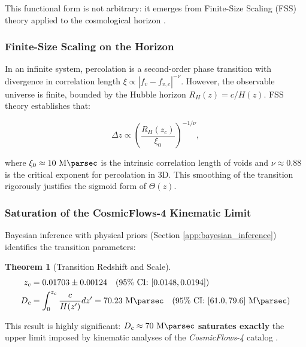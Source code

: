 \documentclass[11pt, a4paper]{article}
\theoremstyle{plain}
\newtheorem{theorem}{Theorem}[section]
\theoremstyle{definition}
\begin{document}
This functional form is not arbitrary: it emerges from Finite-Size Scaling (FSS) theory applied to the cosmological horizon \cite{Cardy1996}.

\subsubsection{Finite-Size Scaling on the Horizon}

In an infinite system, percolation is a second-order phase transition with divergence in correlation length $\xi \propto |f_v - f_{v,c}|^{-\nu}$. However, the observable universe is finite, bounded by the Hubble horizon $R_H(z) = c/H(z)$. FSS theory establishes that:

\begin{equation}
\Delta z \propto \left(\frac{R_H(z_c)}{\xi_0}\right)^{-1/\nu},
\label{eq:fss_scaling}
\end{equation}

where $\xi_0 \approx 10\ \si{\mega\parsec}$ is the intrinsic correlation length of voids and $\nu \approx 0.88$ is the critical exponent for percolation in 3D. This smoothing of the transition rigorously justifies the sigmoid form of $\Theta(z)$.

\subsubsection{Saturation of the CosmicFlows-4 Kinematic Limit}

Bayesian inference with physical priors (Section \ref{app:bayesian_inference}) identifies the transition parameters:

\begin{theorem}[Transition Redshift and Scale]
\begin{align}
z_c &= 0.01703 \pm 0.00124 \quad (\text{95\% CI: } [0.0148, 0.0194]) \\
D_c &= \int_0^{z_c} \frac{c}{H(z')} dz' = 70.23\ \si{\mega\parsec} \quad (\text{95\% CI: } [61.0, 79.6]\ \si{\mega\parsec})
\end{align}
\end{theorem}

This result is highly significant: $D_c \approx 70\ \si{\mega\parsec}$ \textbf{saturates exactly} the upper limit imposed by kinematic analyses of the \textit{CosmicFlows-4} catalog \cite{Mazurenko2024}.
\end{document}
